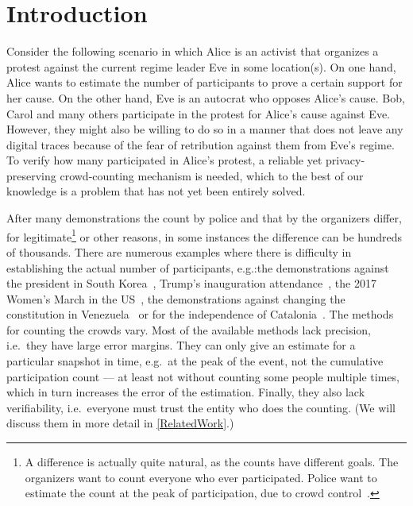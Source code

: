 \section{Introduction}%
\label{Introduction}

Consider the following scenario in which Alice is an activist that organizes a protest against the current regime leader Eve in some location(s).
On one hand, Alice wants to estimate the number of participants to prove a certain support for her cause.
On the other hand, Eve is an autocrat who opposes Alice's cause.
Bob, Carol and many others participate in the protest for Alice's cause against Eve.
However, they might also be willing to do so in a manner that does not leave any digital traces because of the fear of retribution against them from Eve's regime. 
To verify how many participated in Alice's protest, a reliable yet privacy-preserving crowd-counting mechanism is needed, which to the best of our knowledge is a problem that has not yet been entirely solved.

After many demonstrations the count by police and that by the organizers 
differ, for legitimate\footnote{%
  A difference is actually quite natural, as the counts have different goals.
  The organizers want to count everyone who ever participated.
  Police want to estimate the count at the peak of participation, due to crowd 
  control~\cite{2016DemonstrationsInSeoul}.
} or other reasons, in some instances the difference can be hundreds of thousands.
There are numerous examples where there is difficulty in establishing the actual 
number of participants, e.g.:\@ the demonstrations against the president in 
South Korea~\cite{2016DemonstrationsInSeoul}, Trump's inauguration 
attendance~\cite{HowWillWeKnowTrumpInauguralCrowdSize}, the 2017 Women's March 
in the US~\cite{2017WomensMarchesInUS}, the demonstrations against changing the 
constitution in Venezuela~\cite{AlJazeeraOnVenezuela2017} or for the 
independence of Catalonia~\cite{CataloniaDemonstrations}.
The methods for counting the crowds vary.
Most of the available methods lack precision, i.e.\ they have large error 
margins.
They can only give an estimate for a particular snapshot in time, e.g.\ at the 
peak of the event, not the cumulative participation count --- at least not 
without counting some people multiple times, which in turn increases the error 
of the estimation.
Finally, they also lack verifiability, i.e.\ everyone must trust the entity who
does the counting.
(We will discuss them in more detail in \cref{RelatedWork}.)

